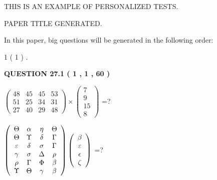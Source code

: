 \documentclass[12pt]{article}
\begin{document}
   
   
   
   
   
   
   
 \vspace{0.2in}
{\Huge  THIS IS AN EXAMPLE OF}
{\Huge  PERSONALIZED TESTS. }
   
   
 PAPER TITLE GENERATED.
   
   
   
\vspace{0.2in}
   
In this paper, big questions will be generated in the following order: 
   
   
             1 (           1 )
 .
  
\vspace{0.2in}
  
{\textbf{\Large{QUESTION
27.1 
 (           1 ,           1 ,          60 )
}}}
  
  
 
$ \left( \begin{array}{ccccccccc}
          48  & 
          45  & 
          45  & 
          53  \\ 
          51  & 
          25  & 
          34  & 
          31  \\ 
          27  & 
          40  & 
          29  & 
          48
\end{array}\right) \times
\left( \begin{array}{c}
           7  \\ 
           9  \\ 
          15  \\ 
           8
\end{array}\right) $ =?
 
 
$  %
 \left( \begin{array}
 {
 c
 c
 c
 c
 }
 \Theta & 
 \alpha & 
 \eta & 
 \Theta \\ 
 \Theta & 
 \Upsilon & 
 \delta & 
 \Gamma \\ 
 \varepsilon & 
 \delta & 
 \sigma & 
 \Gamma \\ 
 \gamma & 
 \sigma & 
 \Delta & 
 \rho \\ 
 \rho & 
 \Gamma & 
 \Phi & 
 \beta \\ 
 \Upsilon & 
 \Theta & 
 \gamma & 
 \beta
 \end{array} \right)
 \left( \begin{array}
 {
 c
 }
 \beta \\ 
 \varepsilon \\ 
 \epsilon \\ 
                    \zeta
 \end{array} \right)
$ =?
 
\end{document}
